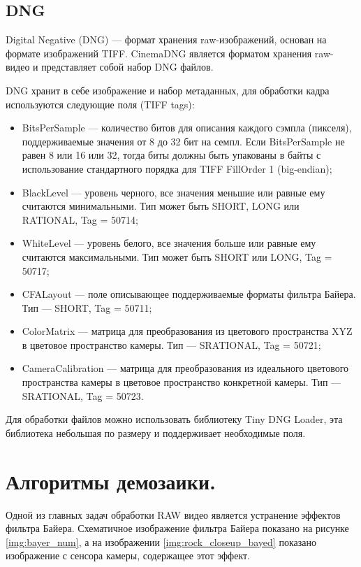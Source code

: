 \subsection{DNG}

Digital Negative (DNG) --- формат хранения raw-изображений, основан на формате изображений TIFF. CinemaDNG является форматом хранения raw-видео и представляет собой набор DNG файлов. 

DNG хранит в себе изображение и набор метаданных, для обработки кадра используются следующие поля (TIFF tags):
\begin{itemize}
	\item BitsPerSample --- количество битов для описания каждого сэмпла (пикселя), поддерживаемые значения от 8 до 32 бит на семпл. Если BitsPerSample не равен 8 или 16 или 32, тогда биты должны быть упакованы в байты с использование стандартного порядка для TIFF FillOrder 1 (big-endian);
	\item BlackLevel --- уровень черного, все значения меньшие или равные ему считаются минимальными. Тип может быть SHORT, LONG или RATIONAL, Tag = 50714;
	\item WhiteLevel --- уровень белого, все значения больше или равные ему считаются максимальными. Тип может быть SHORT или LONG, Tag = 50717;
	\item CFALayout --- поле описывающее поддерживаемые форматы фильтра Байера. Тип --- SHORT, Tag = 50711;
	\item ColorMatrix --- матрица для преобразования из цветового пространства XYZ в цветовое пространство камеры. Тип --- SRATIONAL, Tag = 50721;
	\item CameraCalibration --- матрица для преобразования из идеального цветового пространства камеры в цветовое пространство конкретной камеры. Тип --- SRATIONAL, Tag = 50723. \cite{dngspec}
\end{itemize}

Для обработки файлов можно использовать библиотеку \guillemotleft Tiny DNG Loader\guillemotright, эта библиотека небольшая по размеру и поддерживает необходимые поля.
\section{Алгоритмы демозаики.}

Одной из главных задач обработки RAW видео является устранение эффектов фильтра Байера. Схематичное изображение фильтра Байера показано на рисунке \ref{img:bayer_num}, а на изображении \ref{img:rock_closeup_bayed} показано изображение с сенсора камеры, содержащее этот эффект.

